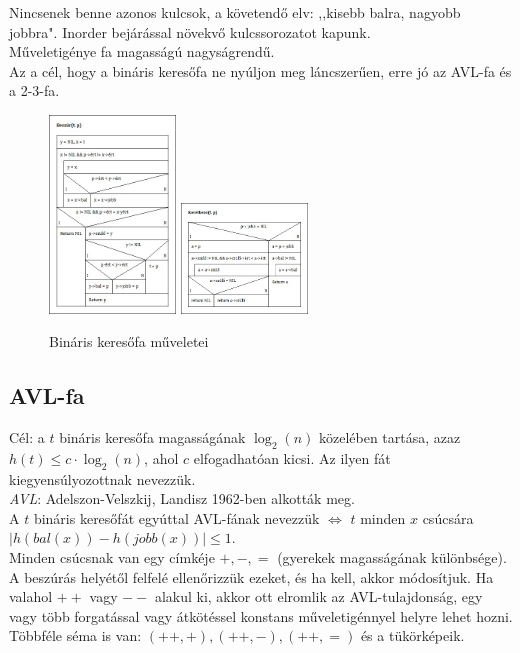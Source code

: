 \documentclass[margin=0px]{article}
\begin{document}
Nincsenek benne azonos kulcsok, a követendő elv: ,,kisebb balra, nagyobb jobbra". Inorder bejárással növekvő kulcssorozatot kapunk. \\
Műveletigénye fa magasságú nagyságrendű. \\
Az a cél, hogy a bináris keresőfa ne nyúljon meg láncszerűen, erre jó az AVL-fa és a 2-3-fa.
\begin{figure}[H]
    \centering
    \includegraphics[width=0.3\textwidth]{img/Beszur.jpg}
    \includegraphics[width=0.3\textwidth]{img/Kovetkezo.jpg}
    \caption{Bináris keresőfa műveletei}
\end{figure}

\subsection{AVL-fa}

Cél: a $t$ bináris keresőfa magasságának $\log_2(n)$ közelében tartása, azaz $h(t) \leq c \cdot \log_2(n)$, ahol $c$ elfogadhatóan kicsi. Az ilyen fát kiegyensúlyozottnak nevezzük. \\
\textit{AVL}: Adelszon-Velszkij, Landisz 1962-ben alkották meg. \\
A $t$ bináris keresőfát egyúttal AVL-fának nevezzük $\iff$ $t$ minden $x$ csúcsára $|h(bal(x))-h(jobb(x))| \leq 1$. \\
Minden csúcsnak van egy címkéje $+,-,=$ (gyerekek magasságának különbsége). A beszúrás helyétől felfelé ellenőrizzük ezeket, és ha kell, akkor módosítjuk. Ha valahol $++$ vagy $--$ alakul ki, akkor ott elromlik az AVL-tulajdonság, egy vagy több forgatással vagy átkötéssel konstans műveletigénnyel helyre lehet hozni. \\
Többféle séma is van: $(++,+), (++,-), (++,=)$ és a tükörképeik.
\end{document}

